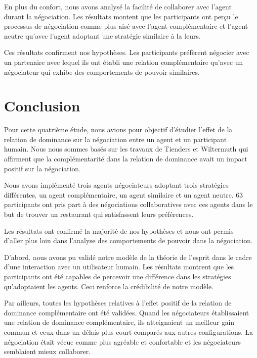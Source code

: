 	En plus du confort, nous avons analysé la facilité de collaborer avec l'agent durant la négociation. Les résultats montent que les participants ont perçu le processus de négociation comme plus aisé avec l'agent complémentaire et l'agent neutre qu'avec l'agent adoptant une stratégie similaire à la leurs. 
	
	Ces résultats confirment nos hypothèses. Les participants préfèrent négocier avec un partenaire avec lequel ils ont établi une relation complémentaire qu'avec un négociateur qui exhibe des comportements de pouvoir similaires. 
	
	
	\section{Conclusion}
		Pour cette quatrième étude, nous avions pour objectif d'étudier l'effet de la relation de dominance sur la négociation entre un agent et un participant humain. Nous nous sommes basés sur les travaux de Tienders et Wiltermuth \cite{wiltermuth2009benefits,tiedens2003power}qui affirment que la complémentarité dans la relation de dominance avait un impact positif sur la négociation. 
		
		Nous avons implémenté trois agents négociateurs adoptant trois stratégies différentes, un agent complémentaire, un agent similaire et un agent neutre. 
		63 participants ont pris part à  des négociations collaboratives avec ces agents dans le but de trouver un restaurant qui satisfassent leurs préférences. 
		
		Les résultats ont confirmé la majorité de nos hypothèses et nous ont permis d'aller plus loin dans l'analyse des comportements de pouvoir dans la négociation. 
		
		D'abord, nous avons pu validé notre modèle de la théorie de l'esprit dans le cadre d'une interaction avec un utilisateur humain. 
		Les résultats montrent que les participants ont été capables de percevoir une différence dans les stratégies qu'adoptaient les agents. Ceci renforce la crédibilité de notre modèle. 
		
		Par ailleurs, toutes les hypothèses relatives à l'effet positif de la relation de dominance complémentaire ont été validées. Quand les négociateurs établissaient une relation de dominance complémentaire, ils atteignaient un meilleur gain commun et ceux dans un délais plus court comparés aux autres configurations. 	La négociation était vécue comme plus agréable et confortable et les négociateurs semblaient mieux collaborer. 
		

